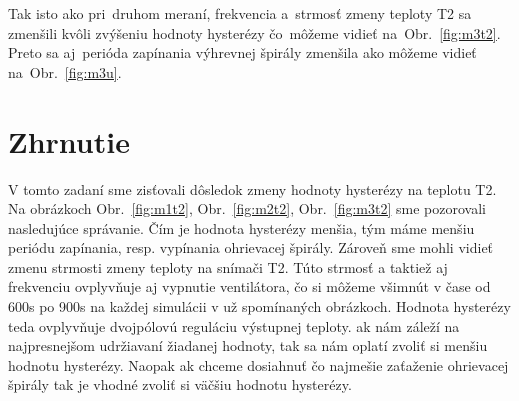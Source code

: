\documentclass{article}
\begin{document}
Tak isto ako pri~druhom meraní, frekvencia a~strmosť zmeny teploty T2 sa zmenšili kvôli zvýšeniu hodnoty hysterézy
čo~môžeme vidieť na~Obr.~\ref{fig:m3t2}. Preto sa aj~perióda zapínania výhrevnej špirály zmenšila ako môžeme vidieť
na~Obr.~\ref{fig:m3u}.

\section{Zhrnutie}
\label{sec:zhrnutie}

V tomto zadaní sme zisťovali dôsledok zmeny hodnoty hysterézy na teplotu T2. Na obrázkoch Obr.~\ref{fig:m1t2}, Obr.~\ref{fig:m2t2}, Obr.~\ref{fig:m3t2} sme pozorovali nasledujúce správanie. Čím je hodnota hysterézy menšia, tým máme menšiu periódu zapínania, resp. vypínania ohrievacej špirály. Zároveň sme mohli vidieť zmenu strmosti zmeny teploty na snímači T2. Túto strmosť a taktiež aj frekvenciu ovplyvňuje aj vypnutie ventilátora, čo si môžeme všimnút v čase od 600s po 900s na každej simulácii v už spomínaných obrázkoch. Hodnota hysterézy teda ovplyvňuje dvojpólovú reguláciu výstupnej teploty. ak nám záleží na najpresnejšom udržiavaní žiadanej hodnoty, tak sa nám oplatí zvoliť si menšiu hodnotu hysterézy. Naopak ak chceme dosiahnuť čo najmešie zaťaženie ohrievacej špirály tak je vhodné zvoliť si väčšiu hodnotu hysterézy.
\end{document}
